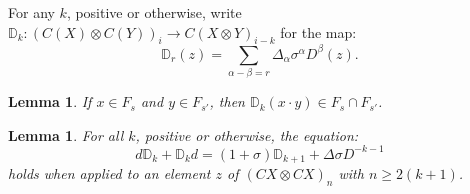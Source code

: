 \documentclass[11pt]{amsart}
\theoremstyle{plain}
\newtheorem{lem}[thm]{Lemma}
\theoremstyle{definition}
\renewcommand{\to}{\longrightarrow}
\newcommand{\twist}{\sigma}
\theoremstyle{plain}
\begin{document}
For any $k$, positive or otherwise, write $\mathbb{D}_k:(C(X)\otimes C(Y))_i\to C(X\otimes Y)_{i-k}$ for the map:
\[\mathbb{D}_r(z)= \sum_{\alpha-\beta=r}\Delta_\alpha\twist^\alpha D^\beta(z).
\]
\begin{lem}\label{DkIsNiceToFiltration}
If $x\in F_s$ and $y\in F_{s'}$, then $\mathbb{D}_k(x\cdot y)\in F_s\cap F_{s'}$.
\end{lem}
\begin{lem}\label{boundaryVsBBD}
For all $k$, positive or otherwise, the equation:
\[d\mathbb{D}_k+\mathbb{D}_kd= (1+\twist)\mathbb{D}_{k+1}+\Delta\sigma D^{-k-1}\]
holds when applied to an element $z$ of $(CX\otimes CX)_{n}$ with $n\geq 2(k+1)$.
\end{lem}
\end{document}
